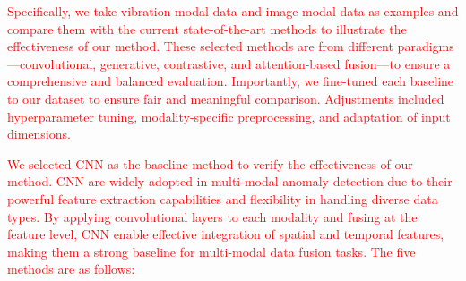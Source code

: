 \documentclass[preprint,12pt]{elsarticle}
\begin{document}
\textcolor{red}{Specifically, we take vibration modal data and image modal data as examples and compare them with the current state-of-the-art methods to illustrate the effectiveness of our method. These selected methods are from different paradigms—convolutional, generative, contrastive, and attention-based fusion—to ensure a comprehensive and balanced evaluation\cite{RN353}. Importantly, we fine-tuned each baseline to our dataset to ensure fair and meaningful comparison. Adjustments included hyperparameter tuning, modality-specific preprocessing, and adaptation of input dimensions. }

\textcolor{red}{We selected CNN as the baseline method to verify the effectiveness of our method. CNN are widely adopted in multi-modal anomaly detection due to their powerful feature extraction capabilities and flexibility in handling diverse data types. By applying convolutional layers to each modality and fusing at the feature level, CNN enable effective integration of spatial and temporal features, making them a strong baseline for multi-modal data fusion tasks. The five methods are as follows:}
\end{document}

